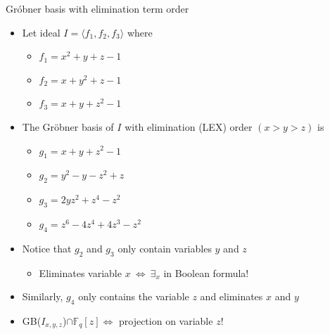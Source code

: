 \documentclass[xcolor=dvipsnames]{beamer}
\newcommand{\Fq}{{\mathbb{F}}_{q}}
\newcommand{\Grobner}{Gr\"{o}bner\xspace}
\begin{document}
\begin{frame}{\large{Gr\'obner basis with elimination term order}}
\begin{itemize}
\item Let ideal $I = \langle f_1, f_2, f_3 \rangle$ where
	\begin{itemize}
	\item $f_1 = x^2 + y + z - 1$
	\item $f_2 = x + y^2 + z - 1$
	\item $f_3 = x + y + z^2 - 1$
	\end{itemize}
\item The \Grobner basis of $I$ with \alert{elimination} (LEX) order $(x > y > z)$ is
	\begin{itemize}
	\item $g_1 = x + y + z^2 - 1$
	\item $g_2 = y^2 - y - z^2 + z$
	\item $g_3 = 2yz^2 + z^4 - z^2$
	\item $g_4 = z^6 - 4z^4 + 4z^3 - z^2$
	\end{itemize}
\item Notice that $g_2$ and $g_3$ only contain variables $y$ and $z$
	\begin{itemize}
	\item Eliminates variable $x~\Leftrightarrow  ~\exists_x$ in Boolean formula!
	\end{itemize}
\item Similarly, $g_4$ only contains the variable $z$ and eliminates $x$ and $y$
\pause
\item GB($I_{x,y,z}$)$\cap\Fq[z]\Leftrightarrow$ \alert{projection} on variable $z$!
\end{itemize}
\end{frame}
\end{document}
